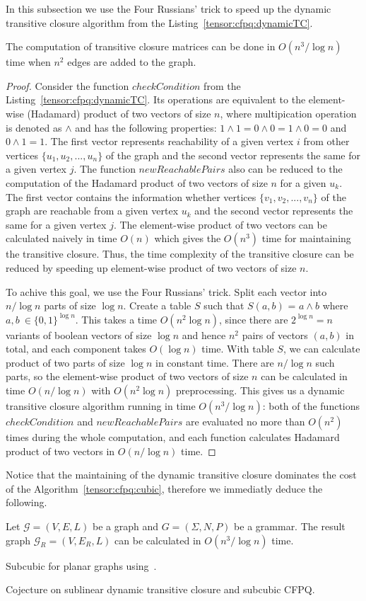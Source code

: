 In this subsection we use the Four Russians' trick to speed up the dynamic transitive closure algorithm from the Listing~\ref{tensor:cfpq:dynamicTC}.
\begin{theorem}{}
    The computation of transitive closure matrices can be done in $O(n^3/\log n)$ time when $n^2$ edges are added to the graph.
\end{theorem}
\begin{proof}
Consider the function $checkCondition$ from the Listing~\ref{tensor:cfpq:dynamicTC}. Its operations are equivalent to the element-wise (Hadamard) product of two vectors of size $n$, where multipication operation is denoted as $\wedge$ and has the following properties: $1 \wedge 1 = 0 \wedge 0 = 1 \wedge 0 = 0$ and $0 \wedge 1 = 1$. The first vector represents reachability of a given vertex $i$ from other vertices $\{u_1, u_2, ..., u_n\}$ of the graph and the second vector represents the same for a given vertex $j$. The function $newReachablePairs$ also can be reduced to the computation of the Hadamard product of two vectors of size $n$ for a given $u_k$. The first vector contains the information whether vertices  $\{v_1, v_2, ..., v_n\}$ of the graph are reachable from a given vertex $u_k$ and the second vector represents the same for a given vertex $j$. The element-wise product of two vectors can be calculated naively in time $O(n)$ which gives the $O(n^3)$ time for maintaining the transitive closure. Thus, the time complexity of the transitive closure can be reduced by speeding up element-wise product of two vectors of size $n$. 


To achive this goal, we use the Four Russians' trick. Split each vector into $n/\log n$ parts of size $\log n$. Create a table $S$ such that $S(a, b)$ = $a \wedge b$ where $a, b \ \in {\{0,1\}}^{\log n}$. This takes a time $O(n^2 \log n)$, since there are $2^{\log n} = n$ variants of boolean vectors of size $\log n$ and hence $n^2$ pairs of vectors $(a, b)$ in total, and each component takes $O(\log n)$ time. With table $S$, we can calculate product of two parts of size $\log n$ in constant time. There are $n/\log n$ such parts, so the element-wise product of two vectors of size $n$ can be calculated in time $O(n/\log n)$ with $O(n^2 \log n)$ preprocessing. This gives us a dynamic transitive closure algorithm running in time $O(n^3/\log n)$: both of the functions $checkCondition$ and  $newReachablePairs$ are evaluated no more than $O(n^2)$ times during the whole computation, and each function calculates Hadamard product of two vectors in $O(n/\log n)$ time.
\end{proof} 
Notice that the maintaining of the dynamic transitive closure dominates the cost of the Algorithm~\ref{tensor:cfpq:cubic}, therefore we immediatly deduce the following.
\begin{corollary}{}
    Let $\mathcal{G} = (V,E,L)$ be a graph and $G = (\Sigma, N, P)$ be a grammar.
    The result graph $\mathcal{G}_R = (V, E_R, L)$ can be calculated in $O(n^3/\log n)$ time.
\end{corollary}



Subcubic for planar graphs using~\cite{10.1007/3-540-57273-2_72}.

Cojecture on sublinear dynamic transitive closure and subcubic CFPQ.